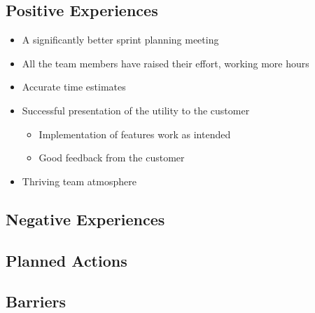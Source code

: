 \subsection{Positive Experiences}
\begin{itemize}
	\item A significantly better sprint planning meeting
	\item All the team members have raised their effort, working more hours
	\item Accurate time estimates
	\item Successful presentation of the utility to the customer
	\begin {itemize}
		\item Implementation of features work as intended
		\item Good feedback from the customer
	\end{itemize}
	\item Thriving team atmosphere
\end{itemize}



\subsection{Negative Experiences}

\subsection{Planned Actions}


\subsection{Barriers}































